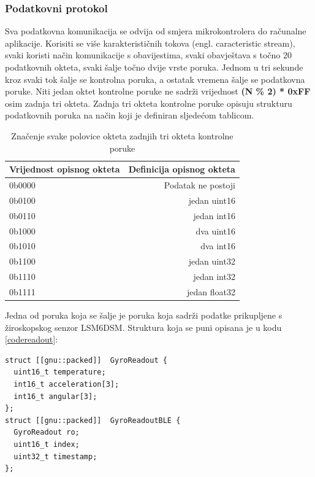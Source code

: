 \documentclass[times, utf8, diplomski]{diplomski}
\begin{document}
\subsubsection{Podatkovni protokol}
Sva podatkovna komunikacija se odvija od smjera mikrokontrolera do računalne aplikacije. Korisiti se više karakterističnih tokova (engl. caracteristic stream), svaki koristi način komunikacije s obavijestima, svaki obavještava s točno 20 podatkovnih okteta, svaki šalje točno dvije vrste poruka. Jednom u tri sekunde kroz svaki tok šalje se kontrolna poruka, a ostatak vremena šalje se podatkovna poruke. Niti jedan oktet kontrolne poruke ne sadrži vrijednost \textbf{(N \% 2) * 0xFF} osim zadnja tri okteta. Zadnja tri okteta kontrolne poruke opisuju strukturu podatkovnih poruka na način koji je definiran sljedećom tablicom.

\begin{table}[H]
  \begin{center}
    \begin{tabular}[c]{l|r}
      \multicolumn{1}{c|}{\textbf{Vrijednost opisnog okteta}} & 
      \multicolumn{1}{c}{\textbf{Definicija opisnog okteta}} \\
      \hline
      0b0000 & Podatak ne postoji \\
      0b0100 & jedan uint16 \\
      0b0110 & jedan int16 \\
      0b1000 & dva uint16 \\
      0b1010 & dva int16 \\
      0b1100 & jedan uint32 \\
      0b1110 & jedan int32 \\
      0b1111 & jedan float32 \\
      \hline
    \end{tabular}
  \caption{Značenje svake polovice okteta zadnjih tri okteta kontrolne poruke}
  \end{center}
\end{table}

Jedna od poruka koja se šalje je poruka koja sadrži podatke prikupljene s žiroskopskog senzor LSM6DSM. Struktura koja se puni opisana je u kodu \ref{codereadout}:

\begin{lstlisting}[caption = {Definicija strukure koja se šalje bluetoothom}, label={codereadout}]
 struct [[gnu::packed]]  GyroReadout {
  uint16_t temperature;
  int16_t acceleration[3];
  int16_t angular[3];
};
struct [[gnu::packed]]  GyroReadoutBLE {
  GyroReadout ro;
  uint16_t index;
  uint32_t timestamp;
};
\end{lstlisting}
\end{document}
